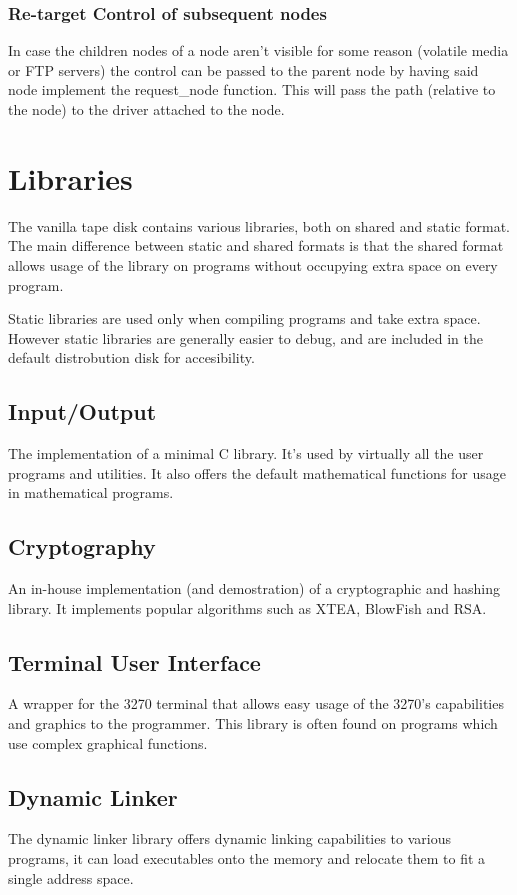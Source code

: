 \documentclass{article}
\begin{document}
\subsubsection{Re-target Control of subsequent nodes}
In case the children nodes of a node aren't visible for some reason (volatile media or FTP servers) the control can be passed to the parent node by having said node implement the request\_node function. This will pass the path (relative to the node) to the driver attached to the node.

\section{Libraries}
The vanilla tape disk contains various libraries, both on shared and static format. The main difference between static and shared formats is that the shared format allows usage of the library on programs without occupying extra space on every program.

Static libraries are used only when compiling programs and take extra space. However static libraries are generally easier to debug, and are included in the default distrobution disk for accesibility.

\subsection{Input/Output}
The implementation of a minimal C library. It's used by virtually all the user programs and utilities. It also offers the default mathematical functions for usage in mathematical programs.

\subsection{Cryptography}
An in-house implementation (and demostration) of a cryptographic and hashing library. It implements popular algorithms such as XTEA, BlowFish and RSA.

\subsection{Terminal User Interface}
A wrapper for the 3270 terminal that allows easy usage of the 3270's capabilities and graphics to the programmer. This library is often found on programs which use complex graphical functions.

\subsection{Dynamic Linker}
The dynamic linker library offers dynamic linking capabilities to various programs, it can load executables onto the memory and relocate them to fit a single address space.
\end{document}
